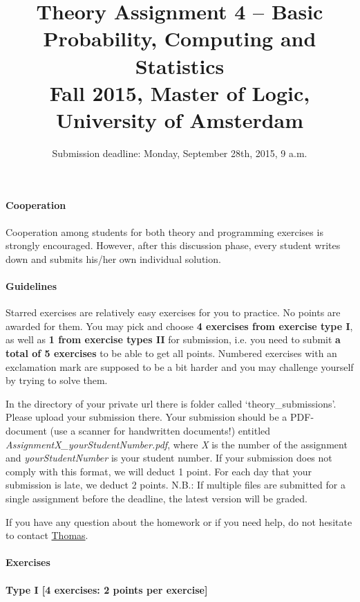 \documentclass{article}
\title{Theory Assignment 4 -- Basic Probability, Computing and Statistics\\[2mm]
\large{Fall 2015, Master of Logic, University of Amsterdam}}
\author{}
\date{Submission deadline: Monday, September 28th, 2015, 9 a.m.}
\begin{document}
\maketitle

\paragraph{Cooperation}
Cooperation among students for both theory and programming exercises
is strongly encouraged.  However, after this discussion phase, every student writes down and submits his/her own individual solution.

\paragraph{Guidelines}
Starred exercises are relatively easy exercises for you to practice. No points are awarded for them. You may pick and choose {\bf 4 exercises from exercise type I}, as well as {\bf 1 from exercise types II} for submission, i.e. you need to submit {\bf a total of 5 exercises} to be able to get all points. Numbered exercises with an exclamation mark are supposed to be a bit harder and you may challenge yourself by trying to solve them.

In the directory of your private url there is folder called `theory\_submissions'. Please upload your submission there. Your submission should be a PDF-document (use a scanner for handwritten documents!) entitled \textit{AssignmentX\_yourStudentNumber.pdf}, where \textit{X} is the number of the assignment and \textit{yourStudentNumber} is your student number. If your submission does not comply with this format, we will deduct 1 point. For each day that your submission is late, we deduct 2 points. N.B.: If multiple files are submitted for a single assignment before the deadline, the latest version will be graded.

If you have any question about the homework or if you need help, do not hesitate to contact \href{mailto:T.S.Brochhagen@uva.nl}{Thomas}.

\paragraph{Exercises}

\paragraph{Type I [4 exercises: 2 points per exercise]}
\end{document}
